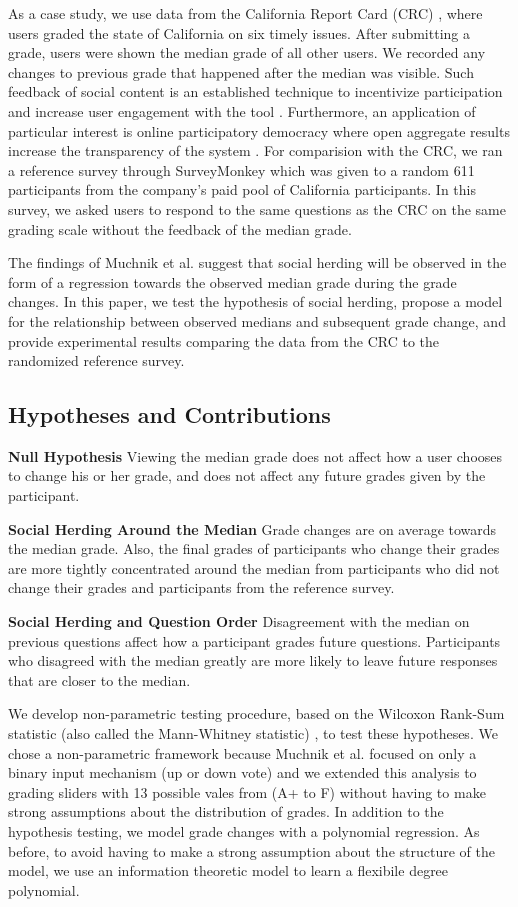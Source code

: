 As a case study, we use data from the California Report Card (CRC) \cite{crc}, where users graded the state of California on six timely issues.
After submitting a grade, users were shown the median grade of all other users.
We recorded any changes to previous grade that happened after the median was visible.
Such feedback of social content is an established technique to incentivize participation and increase user engagement with the tool \cite{shneiderman1992designing}.  
Furthermore, an application of particular interest is online participatory democracy where open aggregate results increase the transparency of the system \cite{albors2008new,o2012transparency,noveck2008wiki}.
For comparision with the CRC, we ran a reference survey through SurveyMonkey which was given to a random 611 participants from the company's paid pool of California participants.
In this survey, we asked users to respond to the same questions as the CRC on the same grading scale without the feedback of the median grade. 

The findings of Muchnik et al. suggest that social herding will be observed in the form of a regression towards the observed median grade during the grade changes.
In this paper, we test the hypothesis of social herding, propose a model for the relationship between observed medians and subsequent grade change, and provide experimental results comparing the data from the CRC to the randomized reference survey.

\subsection{Hypotheses and Contributions}
\noindent \textbf{Null Hypothesis} Viewing the median grade does not affect how a user chooses to change his or her grade, and does not affect any future grades given by the participant.

\noindent \textbf{Social Herding Around the Median} Grade changes are on average towards the median grade. Also, the final grades of participants who change their grades are more tightly concentrated around the median from participants who did not change their grades and participants from the reference survey.

\noindent \textbf{Social Herding and Question Order} Disagreement with the median on previous questions affect how a participant grades future questions. Participants who disagreed with the median greatly are more likely to leave future responses that are closer to the median. 

We develop non-parametric testing procedure, based on the Wilcoxon Rank-Sum statistic (also called the Mann-Whitney statistic) \cite{lehmann2006nonparametrics}, to test these hypotheses.
We chose a non-parametric framework because Muchnik et al. focused on only a binary input mechanism (up or down vote) and we extended this analysis to grading sliders with 13 possible vales from (A+ to F) without having to make strong assumptions about the distribution of grades.
In addition to the hypothesis testing, we model grade changes with a polynomial regression.
As before, to avoid having to make a strong assumption about the structure of the model, we use an information theoretic model to learn a flexibile degree polynomial.


